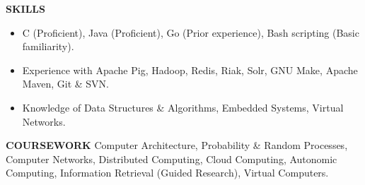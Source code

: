 \documentclass[10pt, letterpaper]{article}
\begin{document}
\textbf{SKILLS}
\smallskip 
\begin{itemize}
    \item C (Proficient), Java (Proficient), Go (Prior experience), Bash scripting (Basic familiarity).
    \item Experience with Apache Pig, Hadoop, Redis, Riak, Solr, GNU Make, Apache Maven, Git \& SVN.
    \item Knowledge of Data Structures \& Algorithms, Embedded Systems, Virtual Networks.
\end{itemize} 

\textbf{COURSEWORK}
\smallskip 
\newline
Computer Architecture, Probability \& Random Processes, Computer Networks, 
Distributed Computing, Cloud Computing, Autonomic Computing, Information Retrieval (Guided Research), Virtual Computers.
\end{document}

